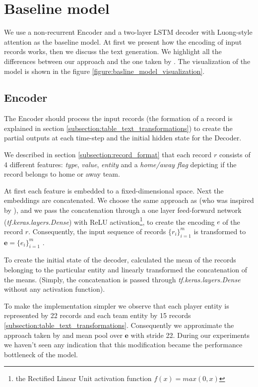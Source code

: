 \section{Baseline model} \label{section:baseline_model}

We use a non-recurrent Encoder and a two-layer LSTM decoder with Luong-style attention as the baseline model. At first we present how the encoding of input records works, then we discuss the text generation. We highlight all the differences between our approach and the one taken by \citet{wiseman2017}. The visualization of the model is shown in the figure \ref{figure:basline_model_visualization}.

\subsection{Encoder} \label{subsection:baseline_model_encoder}

The Encoder should process the input records (the formation of a record is explained in section \ref{subsection:table_text_transformations}) to create the partial outputs at each time-step and the initial hidden state for the Decoder.

We described in section \ref{subsection:record_format} that each record $r$ consists of 4 different features: \emph{type}, \emph{value}, \emph{entity} and a \emph{home/away flag} depicting if the record belongs to home or away team.

At first each feature is embedded to a fixed-dimensional space. Next the embeddings are concatenated. We choose the same approach as \citet{wiseman2017} (who was inspired by \citet{yang2016referenceaware}), and we pass the concatenation through a one layer feed-forward network (\emph{tf.keras.layers.Dense}) with ReLU activation\footnote{the Rectified Linear Unit activation function $f(x) = max(0, x)$}, to create the encoding $e$ of the record $r$. Consequently, the input sequence of records $\{r_i\}_{i=1}^m$ is transformed to $\boldsymbol{e} = \{ e_i \}_{i=1}^m$ .

To create the initial state of the decoder, \citet{wiseman2017} calculated the mean of the records belonging to the particular entity and linearly transformed the concatenation of the means. (Simply, the concatenation is passed through \emph{tf.keras.la\-yers.Dense} without any activation function).

To make the implementation simpler we observe that each player entity is represented by 22 records and each team entity by 15 records \ref{subsection:table_text_transformations}.  Consequently we approximate the approach taken by \citet{wiseman2017} and mean pool over $\boldsymbol{e}$ with stride 22. During our experiments we haven't seen any indication that this modification became the performance bottleneck of the model.

